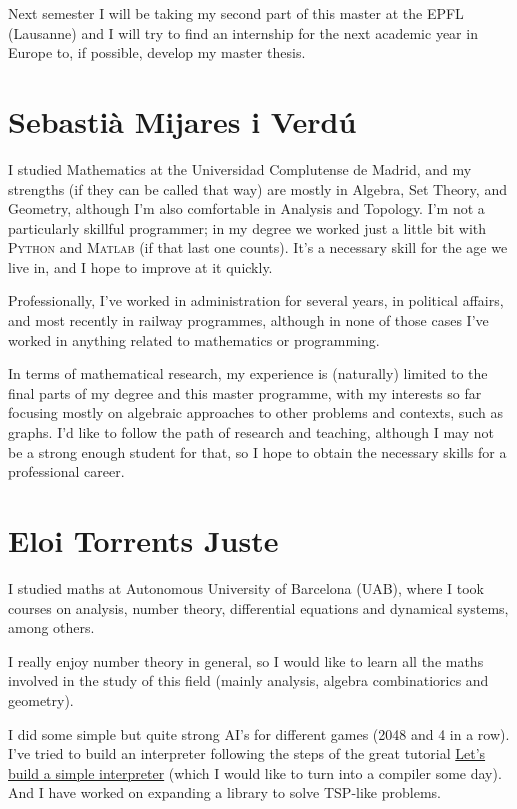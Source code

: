 \documentclass[11pt]{amsart}
\begin{document}
Next semester I will be taking my second part of this master at the EPFL (Lausanne) and I will try to find an internship for the next academic year in Europe to, if possible, develop my master thesis.


\medskip

\section*{Sebastià Mijares i Verdú}
I studied Mathematics at the Universidad Complutense de Madrid, and my strengths (if they can be called that way) are mostly in Algebra, Set Theory, and Geometry, although I'm also comfortable in Analysis and Topology.
I'm not a particularly skillful programmer; in my degree we worked just a little bit with \textsc{Python} and \textsc{Matlab} (if that last one counts). It's a necessary skill for the age we live in, and I hope to improve
at it quickly.

Professionally, I've worked in administration for several years, in political affairs, and most recently in railway programmes, although in none of those cases I've worked in anything related to mathematics or programming.

In terms of mathematical research, my experience is (naturally) limited to the final parts of my degree and this master programme, with my interests so far focusing mostly on algebraic approaches to other problems and contexts,
such as graphs. I'd like to follow the path of research and teaching, although I may not be a strong enough student for that, so I hope to obtain the necessary skills for a professional career.
\medskip

\section*{Eloi Torrents Juste}

I studied maths at Autonomous University of Barcelona (UAB), where I took courses on analysis, number theory, differential equations and dynamical systems, among others.

I really enjoy number theory in general, so I would like to learn all the maths involved in the study of this field (mainly analysis, algebra combinatiorics and geometry).

I did some simple but quite strong AI's for different games (2048 and 4 in a row). I've tried to build an interpreter following the steps of the great tutorial \href{https://ruslanspivak.com/lsbasi-part1/}{Let’s build a simple interpreter} (which I would like to turn into a compiler some day). And I have worked on expanding a library to solve TSP-like problems.
\end{document}
